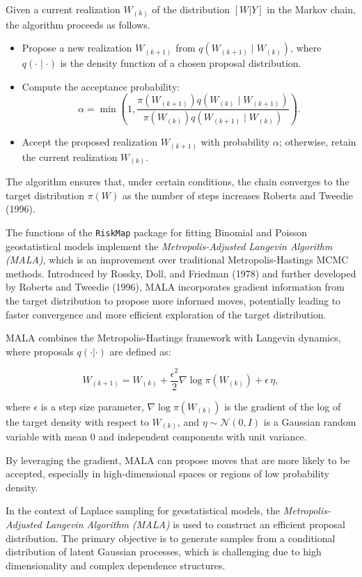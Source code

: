 \documentclass[
  letterpaper,
]{krantz}
\providecommand{\tightlist}{%
  \setlength{\itemsep}{0pt}\setlength{\parskip}{0pt}}
\begin{document}
Given a current realization \(W_{(k)}\) of the distribution \([W | Y]\)
in the Markov chain, the algorithm proceeds as follows.

\begin{itemize}
\tightlist
\item
  Propose a new realization \(W_{(k+1)}\) from
  \(q(W_{(k+1)} \mid W_{(k)})\), where \(q(\cdot \mid \cdot)\) is the
  density function of a chosen proposal distribution.
\item
  Compute the acceptance probability: \[
  \alpha = \min \left(1, \frac{\pi(W_{(k+1)}) q(W_{(k)} \mid W_{(k+1)})}{\pi(W_{(k)}) q(W_{(k+1)} \mid W_{(k)})} \right).
  \]
\item
  Accept the proposed realization \(W_{(k+1)}\) with probability
  \(\alpha\); otherwise, retain the current realization \(W_{(k)}\).
\end{itemize}

The algorithm ensures that, under certain conditions, the chain
converges to the target distribution \(\pi(W)\) as the number of steps
increases Roberts and Tweedie (1996).

The functions of the \texttt{RiskMap} package for fitting Binomial and
Poisson geostatistical models implement the
\textit{Metropolis-Adjusted Langevin Algorithm (MALA)}, which is an
improvement over traditional Metropolis-Hastings MCMC methods.
Introduced by Rossky, Doll, and Friedman (1978) and further developed by
Roberts and Tweedie (1996), MALA incorporates gradient information from
the target distribution to propose more informed moves, potentially
leading to faster convergence and more efficient exploration of the
target distribution.

MALA combines the Metropolis-Hastings framework with Langevin dynamics,
where proposals \(q(\cdot | \cdot)\) are defined as:

\[
W_{(k+1)} = W_{(k)} + \frac{\epsilon^2}{2} \nabla \log \pi(W_{(k)}) + \epsilon \, \eta,
\]

where \(\epsilon\) is a step size parameter,
\(\nabla \log \pi(W_{(k)})\) is the gradient of the log of the target
density with respect to \(W_{(k)}\), and \(\eta \sim \mathcal{N}(0, I)\)
is a Gaussian random variable with mean 0 and independent components
with unit variance.

By leveraging the gradient, MALA can propose moves that are more likely
to be accepted, especially in high-dimensional spaces or regions of low
probability density.

In the context of Laplace sampling for geostatistical models, the
\textit{Metropolis-Adjusted Langevin Algorithm (MALA)} is used to
construct an efficient proposal distribution. The primary objective is
to generate samples from a conditional distribution of latent Gaussian
processes, which is challenging due to high dimensionality and complex
dependence structures.
\end{document}
